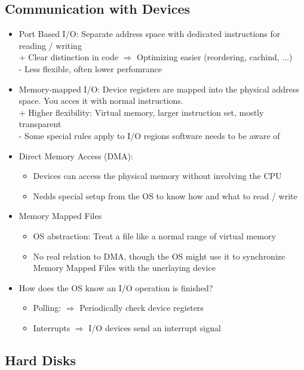 \documentclass{kit}
\begin{document}
  \subsection{Communication with Devices}
    \begin{itemize}
      \item Port Based I/O: Separate address space with dedicated instructions for reading / writing\\
        + Clear distinction in code $\Rightarrow$ Optimizing easier (reordering, cachind, ...)\\
        - Less flexible, often lower perfomrance
      \item Memory-mapped I/O: Device registers are mapped into the physical address space. You acces it with normal
        instructions.\\
        + Higher flexibility: Virtual memory, larger instruction set, mostly transparent\\
        - Some special rules apply to I/O regions software needs to be aware of
      \item Direct Memory Access (DMA):
        \begin{itemize}
          \item Devices can access the physical memory without involving the CPU
          \item Nedds special setup from the OS to know how and what to read / write
        \end{itemize}
      \item Memory Mapped Files
        \begin{itemize}
          \item OS abstraction: Treat a file like a normal range of virtual memory
          \item No real relation to DMA, though the OS might use it to synchronize Memory Mapped Files with the
            unerlaying device
        \end{itemize}
      \item How does the OS know an I/O operation is finished?
        \begin{itemize}
          \item Polling: $\Rightarrow$ Periodically check device registers
          \item Interrupts $\Rightarrow$ I/O devices send an interrupt signal
        \end{itemize}
    \end{itemize}
  \subsection{Hard Disks}
\end{document}
